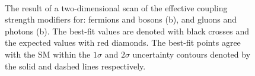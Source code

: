 \begin{figure}[ht!]
\centering
{}\\
\caption{The result of a two-dimensional \DNLL scan of the effective coupling strength modifiers for: fermions and bosons (b), and gluons and photons (b). The best-fit values are denoted with black crosses and the \SM expected values with red diamonds. The best-fit points agree with the SM within the $1\sigma$ and $2\sigma$ uncertainty contours denoted by the solid and dashed lines respectively.}

\label{fig:statandresults:kappa_plots}

\end{figure}
